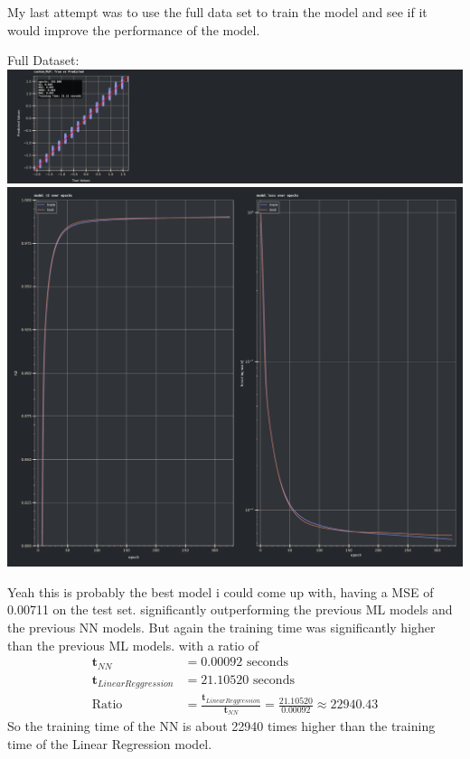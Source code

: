 \documentclass{assignment}
\begin{document}
My last attempt was to use the full data set to train the model and see if it would improve the performance of the model.
\begin{center}
    Full Dataset:
    \includegraphics[width=6.5in,trim={0 0 30cm 0},clip]{../report/assets/nn9_best_models_result.pdf}
    \includegraphics[width=6.5in]{../report/assets/nn9_nn_results.pdf}
\end{center}
Yeah this is probably the best model i could come up with, having a MSE of 0.00711 on the test set.
significantly outperforming the previous ML models and the previous NN models.
But again the training time was significantly higher than the previous ML models.
with a ratio of 
\begin{align}
    \textbf{t}_{NN} &= 0.00092 \text{ seconds} \\
    \textbf{t}_{LinearReggression} &= 21.10520 \text{ seconds} \\
    \text{Ratio} &= \frac{\textbf{t}_{LinearReggression}}{\textbf{t}_{NN}} = \frac{21.10520}{0.00092} \approx 22940.43
\end{align}
So the training time of the NN is about 22940 times higher than the training time of the Linear Regression model.
\end{document}
